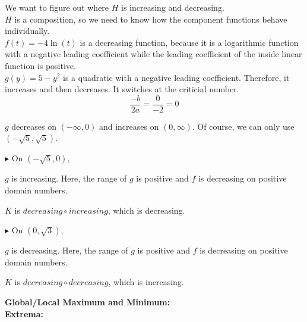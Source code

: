 \documentclass{ximera}
\begin{document}
We want to figure out where $H$ is increasing and decreasing. \\

$H$ is a composition, so we need to know how the component functions behave individually. \\





$f(t) = -4 \ln(t)$ is a decreasing function, because it is a logarithmic function with a negative leading coefficient while the leading coefficient of the inside linear function is  positive. \\

$g(y) = 5 - y^2$ is a quadratic with a negative leading coefficient.  Therefore, it increases and then decreases.   It switches at the criticial number.\\



\[
\frac{-b}{2 a} = \frac{0}{-2} = 0
\]


$g$ decreases on $(-\infty, 0)$ and increases on $(0, \infty)$.  Of course, we can only use $(-\sqrt{5}, \sqrt{5})$.





\textbf{\textcolor{blue!55!black}{$\blacktriangleright$}} On $(-\sqrt{5}, 0)$, 


$g$ is increasing. Here, the range of $g$ is positive and $f$ is decreasing on positive domain numbers.

\begin{center}
$K$ is $decreasing \circ increasing$, which is decreasing. \\
\end{center}




\textbf{\textcolor{blue!55!black}{$\blacktriangleright$}} On $(0, \sqrt{3})$, 


$g$ is decreasing. Here, the range of $g$ is positive and $f$ is decreasing on positive domain numbers.


\begin{center}
$K$ is $decreasing \circ decreasing$, which is increasing. \\
\end{center}







\textbf{\textcolor{blue!55!black}{Global/Local Maximum and Minimum:}} \\
\textbf{Extrema:} \\
\end{document}
